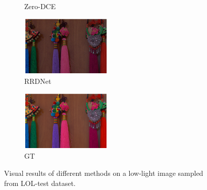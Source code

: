 \documentclass[letterpaper,12pt]{article}
\begin{document}
\begin{figure}[htbp]
\begin{subfigure}{0.18\textwidth}
			\captionsetup{font=scriptsize}
			\caption{Zero-DCE}
			\label{fig: LOL-test_m}  
		\end{subfigure}
		\begin{subfigure}{0.18\textwidth}
			\includegraphics[width=\linewidth]{LOL-test_dataset/RRDNet}
			\captionsetup{font=scriptsize}
			\caption{RRDNet}
			\label{fig: LOL-test_n}  
		\end{subfigure}
		\begin{subfigure}{0.18\textwidth}
			\includegraphics[width=\linewidth]{LOL-test_dataset/GT}
			\captionsetup{font=scriptsize}
			\caption{GT}
			\label{fig: LOL-test_o}  
		\end{subfigure}
		
		\captionsetup{font=scriptsize}
		\caption{
			\label{fig: Visual Result from LOL-test dataset}
			Visual results of different methods on a low-light image sampled from LOL-test dataset.
		}
	\end{figure}
	
\end{document}
